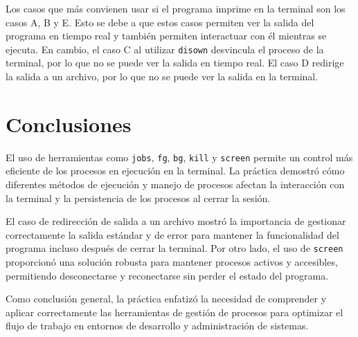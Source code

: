 \documentclass[12pt, letterpaper]{article}
\begin{document}
Los casos que más convienen usar si el programa imprime en la terminal son los casos A, B y E. Esto se debe a que estos casos permiten ver la salida del programa en tiempo real y también permiten interactuar con él mientras se ejecuta. En cambio, el caso C al utilizar \texttt{disown} desvincula el proceso de la terminal, por lo que no se puede ver la salida en tiempo real. El caso D redirige la salida a un archivo, por lo que no se puede ver la salida en la terminal.

\section*{\centering \fontsize{14}{17}\sffamily\selectfont Conclusiones}

El uso de herramientas como \texttt{jobs}, \texttt{fg}, \texttt{bg}, \texttt{kill} y \texttt{screen} permite un control más eficiente de los procesos en ejecución en la terminal. La práctica demostró cómo diferentes métodos de ejecución y manejo de procesos afectan la interacción con la terminal y la persistencia de los procesos al cerrar la sesión.

El caso de redirección de salida a un archivo mostró la importancia de gestionar correctamente la salida estándar y de error para mantener la funcionalidad del programa incluso después de cerrar la terminal. Por otro lado, el uso de \texttt{screen} proporcionó una solución robusta para mantener procesos activos y accesibles, permitiendo desconectarse y reconectarse sin perder el estado del programa.

Como conclusión general, la práctica enfatizó la necesidad de comprender y aplicar correctamente las herramientas de gestión de procesos para optimizar el flujo de trabajo en entornos de desarrollo y administración de sistemas.
% 
\end{document}
